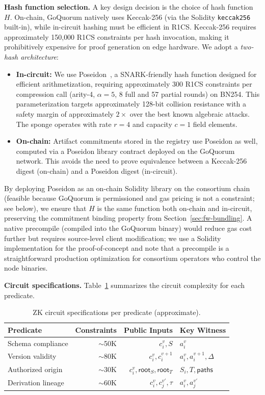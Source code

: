 \textbf{Hash function selection.}
A key design decision is the choice of hash function $H$.
On-chain, GoQuorum natively uses Keccak-256 (via the Solidity \texttt{keccak256} built-in), while in-circuit hashing must be efficient in R1CS.
Keccak-256 requires approximately 150{,}000 R1CS constraints per hash invocation, making it prohibitively expensive for proof generation on edge hardware.
We adopt a \emph{two-hash architecture}:
\begin{itemize}
    \item \textbf{In-circuit:} We use Poseidon~\cite{poseidon_hash}, a SNARK-friendly hash function designed for efficient arithmetization, requiring approximately 300 R1CS constraints per compression call (arity-4, $\alpha=5$, 8 full and 57 partial rounds) on BN254.
    This parameterization targets approximately 128-bit collision resistance with a safety margin of approximately $2\times$ over the best known algebraic attacks.
    The sponge operates with rate $r=4$ and capacity $c=1$ field elements.
    \item \textbf{On-chain:} Artifact commitments stored in the registry use Poseidon as well, computed via a Poseidon library contract deployed on the GoQuorum network. This avoids the need to prove equivalence between a Keccak-256 digest (on-chain) and a Poseidon digest (in-circuit).
\end{itemize}
By deploying Poseidon as an on-chain Solidity library on the consortium chain (feasible because GoQuorum is permissioned and gas pricing is not a constraint; see below), we ensure that $H$ is the same function both on-chain and in-circuit, preserving the commitment binding property from Section~\ref{sec:fw-bundling}.
A native precompile (compiled into the GoQuorum binary) would reduce gas cost further but requires source-level client modification; we use a Solidity implementation for the proof-of-concept and note that a precompile is a straightforward production optimization for consortium operators who control the node binaries.

\textbf{Circuit specifications.}
Table~\ref{tab:circuits} summarizes the circuit complexity for each predicate.

\begin{table}[t]
\centering
\caption{ZK circuit specifications per predicate (approximate).}
\label{tab:circuits}
\begin{tabular}{lrrl}
\toprule
\textbf{Predicate} & \textbf{Constraints} & \textbf{Public Inputs} & \textbf{Key Witness} \\
\midrule
Schema compliance & $\sim$50K & $c_i^{v}, S$ & $a_i^{v}$ \\
Version validity & $\sim$80K & $c_i^{v}, c_i^{v+1}$ & $a_i^{v}, a_i^{v+1}, \Delta$ \\
Authorized origin & $\sim$30K & $c_i^{v}, \mathsf{root}_S, \mathsf{root}_T$ & $S_i, T, \mathsf{paths}$ \\
Derivation lineage & $\sim$60K & $c_i^{v}, c_j^{v'}, \tau$ & $a_i^{v}, a_j^{v'}$ \\
\bottomrule
\end{tabular}
\end{table}

